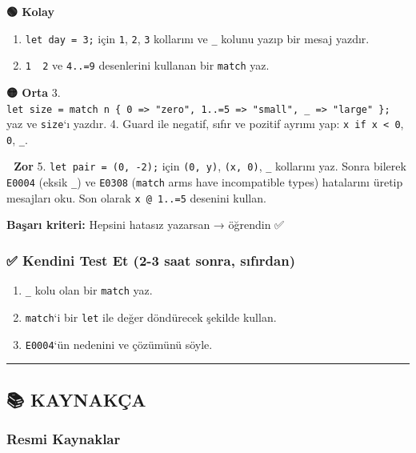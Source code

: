 \documentclass[12pt,a4paper]{article}
\begin{document}
\textbf{🟢 Kolay}

\begin{enumerate}
\def\labelenumi{\arabic{enumi}.}
\tightlist
\item
  \texttt{let\ day\ =\ 3;} için \texttt{1}, \texttt{2}, \texttt{3} kollarını ve \texttt{\_} kolunu yazıp bir mesaj yazdır.
\item
  \texttt{1\ \textbar{}\ 2} ve \texttt{4..=9} desenlerini kullanan bir \texttt{match} yaz.
\end{enumerate}

\textbf{🟡 Orta}
3. \texttt{let\ size\ =\ match\ n\ \{\ 0\ =\textgreater{}\ "zero",\ 1..=5\ =\textgreater{}\ "small",\ \_\ =\textgreater{}\ "large"\ \};} yaz ve \texttt{size}`ı yazdır.
4. Guard ile negatif, sıfır ve pozitif ayrımı yap: \texttt{x\ if\ x\ \textless{}\ 0}, \texttt{0}, \texttt{\_}.

\textbf{🔴 Zor}
5. \texttt{let\ pair\ =\ (0,\ -2);} için \texttt{(0,\ y)}, \texttt{(x,\ 0)}, \texttt{\_} kollarını yaz. Sonra bilerek \texttt{E0004} (eksik \texttt{\_}) ve \texttt{E0308} (\texttt{match} arms have incompatible types) hatalarını üretip mesajları oku. Son olarak \texttt{x\ @\ 1..=5} desenini kullan.

\textbf{Başarı kriteri:} Hepsini hatasız yazarsan → öğrendin ✅

\subsubsection{✅ Kendini Test Et (2-3 saat sonra, sıfırdan)}\label{kendini-test-et-2-3-saat-sonra-sıfırdan-7}

\begin{enumerate}
\def\labelenumi{\arabic{enumi}.}
\tightlist
\item
  \texttt{\_} kolu olan bir \texttt{match} yaz.
\item
  \texttt{match}`i bir \texttt{let} ile değer döndürecek şekilde kullan.
\item
  \texttt{E0004}`ün nedenini ve çözümünü söyle.
\end{enumerate}

\begin{center}\rule{0.5\linewidth}{0.5pt}\end{center}

\subsection{📚 KAYNAKÇA}\label{kaynakça-7}

\subsubsection{Resmi Kaynaklar}\label{resmi-kaynaklar-7}
\end{document}
